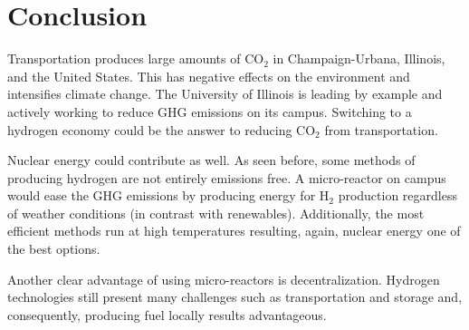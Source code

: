 \documentclass{anstrans}
\begin{document}
\section{Conclusion}

Transportation produces large amounts of CO$_2$ in Champaign-Urbana, Illinois, and the United States. This has negative effects on the environment and intensifies climate change. The University of Illinois is leading by example and actively working to reduce GHG emissions on its campus. Switching to a hydrogen economy could be the answer to reducing CO$_2$ from transportation. 

Nuclear energy could contribute as well. As seen before, some methods of producing hydrogen are not entirely emissions free. A micro-reactor on campus would ease the GHG emissions by producing energy for H$_2$ production regardless of weather conditions (in contrast with renewables). Additionally, the most efficient methods run at high temperatures resulting, again, nuclear energy one of the best options.

Another clear advantage of using micro-reactors is decentralization. Hydrogen technologies still present many challenges such as transportation and storage \cite{office_of_energy_efficiency_and_renewable_energy_hydrogen_2020}\cite{office_of_energy_efficiency_and_renewable_energy_hydrogen_delivery_2020} and, consequently, producing fuel locally results advantageous.



\end{document}
